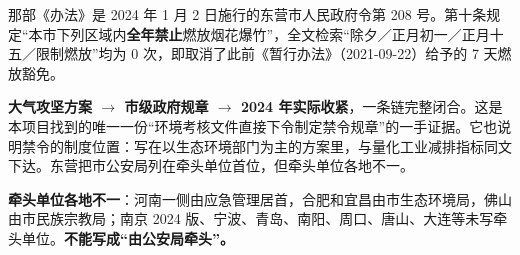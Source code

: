 那部《办法》是 2024 年 1 月 2 日施行的东营市人民政府令第 208 号。第十条规定“本市下列区域内\textbf{全年禁止}燃放烟花爆竹”，全文检索“除夕／正月初一／正月十五／限制燃放”均为 0 次，即取消了此前《暂行办法》（2021-09-22）给予的 7 天燃放豁免。

\textbf{大气攻坚方案 $\rightarrow$ 市级政府规章 $\rightarrow$ 2024 年实际收紧}，一条链完整闭合。这是本项目找到的唯一一份“环境考核文件直接下令制定禁令规章”的一手证据。它也说明禁令的制度位置：写在以生态环境部门为主的方案里，与量化工业减排指标同文下达。东营把市公安局列在牵头单位首位，但牵头单位各地不一。

\textbf{牵头单位各地不一}：河南一侧由应急管理居首，合肥和宜昌由市生态环境局，佛山由市民族宗教局；南京 2024 版、宁波、青岛、南阳、周口、唐山、大连等未写牵头单位。\textbf{不能写成“由公安局牵头”。}

